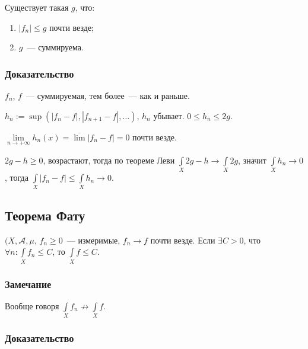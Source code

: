\documentclass{article}
\begin{document}
            Существует такая $g$, что:
            
            \begin{enumerate}
            
                \item $|f_n| \leqslant g$ почти везде;
                
                \item $g$~--- суммируема.
                
            \end{enumerate}
            
            \subsubsection{Доказательство}
            
                $f_n$, $f$~--- суммируемая, тем более~--- как и раньше.
                
                $h_n := \sup( |f_n - f|, |f_{n + 1} - f|, \ldots )$, $h_n$ убывает. $0 \leqslant h_n \leqslant 2g$.
                
                $\lim\limits_{n \rightarrow +\infty} h_n(x) = \overline{\lim} |f_n - f| = 0$ почти везде.
                
                $2g - h \geqslant 0$, возрастают, тогда по теореме Леви $\int\limits_X 2g - h \rightarrow \int\limits_X 2g$, значит $\int\limits_X h_n \rightarrow 0$, тогда $\int\limits_X |f_n - f| \leqslant \int\limits_X h_n \rightarrow 0$.
                
        \subsection{Теорема Фату}
        
            $(X, \mathcal{A}, \mu$, $f_n \geqslant 0$~--- измеримые, $f_n \rightarrow f$ почти везде. Если $\exists C > 0$, что $\forall n : \int\limits_X f_n \leqslant C$, то $\int\limits_X f \leqslant C$.
            
            \subsubsection{Замечание}
            
                Вообще говоря $\int\limits_X f_n \not\rightarrow \int\limits_X f$.
                
            \subsubsection{Доказательство}
            
\end{document}
